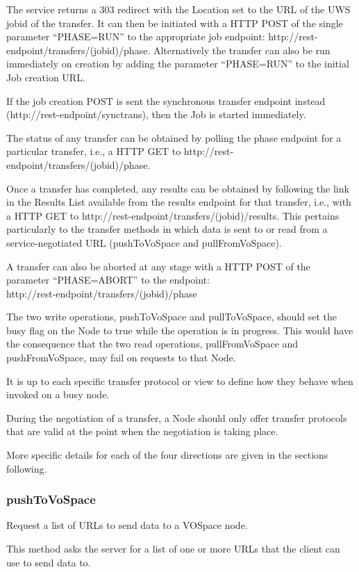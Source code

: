 \documentclass[11pt,a4paper]{ivoa}
\begin{document}
The service returns a 303 redirect with the Location set to the URL of the UWS jobid of the transfer.  It can then be initiated with a HTTP POST of the single parameter ``PHASE=RUN'' to the appropriate job endpoint: http://rest-endpoint/transfers/(jobid)/phase. Alternatively the transfer can also be run immediately on creation by adding the parameter ``PHASE=RUN'' to the initial Job creation URL.

If the job creation POST is sent the synchronous transfer endpoint instead (http://rest-endpoint/synctrans), then the Job is started immediately.

The status of any transfer can be obtained by polling the phase endpoint for a particular transfer, i.e., a HTTP GET to http://rest-endpoint/transfers/(jobid)/phase.

Once a transfer has completed, any results can be obtained by following the link in the Results List available from the results endpoint for that transfer, i.e., with a HTTP GET to http://rest-endpoint/transfers/(jobid)/results. This pertains particularly to the transfer methods in which data is sent to or read from a service-negotiated URL (pushToVoSpace and pullFromVoSpace).

A transfer can also be aborted at any stage with a HTTP POST of the parameter ``PHASE=ABORT'' to the endpoint:\\ http://rest-endpoint/transfers/(jobid)/phase

The two write operations, pushToVoSpace and pullToVoSpace, should set the busy flag on the Node to true while the operation is in progress.  This would have the consequence that the two read operations, pullFromVoSpace and pushFromVoSpace, may fail on requests to that Node.

It is up to each specific transfer protocol or view to define how they behave when invoked on a busy node.

During the negotiation of a transfer, a Node should only offer transfer protocols that are valid at the point when the negotiation is taking place.

More specific details for each of the four directions are given in the sections following.

\subsubsection{pushToVoSpace}
\label{subsubsec:pushtovospace}
Request a list of URLs to send data to a VOSpace node.

This method asks the server for a list of one or more URLs that the client can use to send data to.
\end{document}
